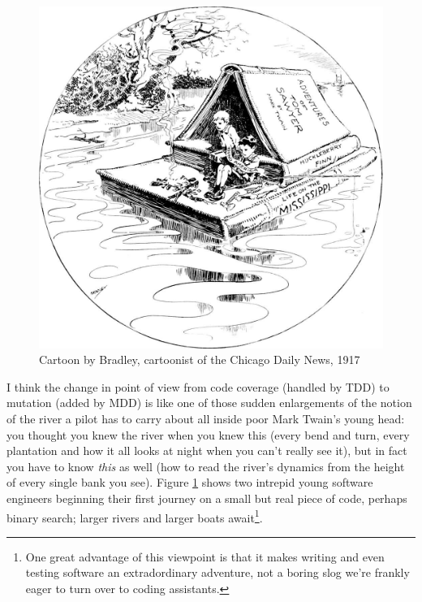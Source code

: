 \documentclass[sigplan,screen]{acmart}
\begin{document}
\begin{figure}
  \includegraphics[width=\columnwidth]{twain2.jpg}
  \caption{Cartoon by Bradley, cartoonist of the Chicago Daily News, 1917}
  \label{fig:twain}
  \end{figure}

I think the change in point of view from code coverage (handled by
TDD) to mutation (added by MDD) is like one of those sudden
enlargements of the notion of the river a pilot has to carry about all
inside poor Mark Twain's young head:  you thought you knew the river
when you knew this (every bend and turn, every plantation and how it
all looks at night when you can't really see it), but in fact you have
to know \emph{this} as well (how to read the river's dynamics from
the height of every single bank you see).  Figure \ref{fig:twain}
shows two intrepid young software engineers beginning their
first journey on a small but real piece of code, perhaps binary search; larger
rivers and larger boats await\footnote{One great advantage of this
  viewpoint is that it makes writing and even testing software an
  extradordinary adventure, not a boring slog we're frankly eager to
  turn over to coding assistants.}.
\end{document}
